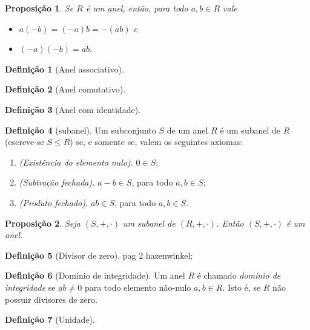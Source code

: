 \documentclass[a4paper,12pt]{report}
\theoremstyle{plain}
\newtheorem{proposicao}{Proposição}[section]
\theoremstyle{definition}
\newtheorem{definicao}{Definição}[section]
\begin{document}
\begin{proposicao}
	Se $R$ é um anel, então, para todo $a,b\in R$ vale
	\begin{itemize}
		\item $a(-b) = (-a)b = -(ab)$ e
		\item $(-a)(-b) = ab.$
	\end{itemize}
\end{proposicao}

\begin{definicao}[Anel associativo]
	
\end{definicao}

\begin{definicao}[Anel comutativo]
	
\end{definicao}

\begin{definicao}[Anel com identidade]
	
\end{definicao}

\begin{definicao}[subanel]
	Um subconjunto $S$ de um anel $R$ é um subanel de $R$ (escreve-se $S\leq R$) se, e somente se, valem os seguintes axiomas:
	\begin{enumerate}
		\item \emph{(Existência do elemento nulo).} $0 \in S$;
		\item \emph{(Subtração fechada).} $a-b \in S$, para todo $a,b\in S$;
		\item \emph{(Produto fechado).} $ab\in S$, para todo $a,b\in S$.
	\end{enumerate}
\end{definicao}

\begin{proposicao}
	Seja $(S,+, \cdot)$ um subanel de $(R,+, \cdot)$. Então $(S,+, \cdot)$ é um anel.	
\end{proposicao}

\begin{definicao}[Divisor de zero]
	pag 2 hazenwinkel;
\end{definicao}

\begin{definicao}[Domínio de integridade]
	Um anel $R$ é chamado \emph{domínio de integridade} se $ab \neq 0$ para todo elemento não-nulo $a,b \in R$. Isto é, se $R$ não possuir divisores de zero.
\end{definicao}

\begin{definicao}[Unidade]
	
\end{definicao}
\end{document}
